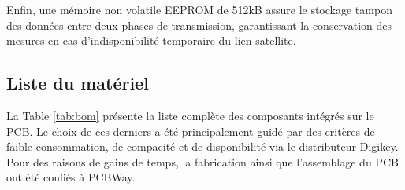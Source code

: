 \documentclass[12pt]{article}
\begin{document}
Enfin, une mémoire non volatile EEPROM de 512kB assure le stockage tampon des données entre deux phases de transmission, garantissant la conservation des mesures en cas d’indisponibilité temporaire du lien satellite.


\subsection{Liste du matériel}

La Table \ref{tab:bom} présente la liste complète des composants intégrés sur le PCB. Le choix de ces derniers a été principalement guidé par des critères de faible consommation, de compacité et de disponibilité via le distributeur Digikey. \\
Pour des raisons de gains de temps, la fabrication ainsi que l’assemblage du PCB ont été confiés à PCBWay.
\end{document}

